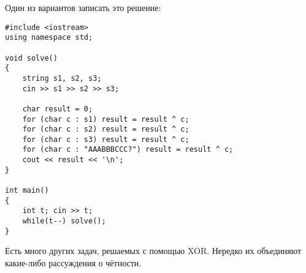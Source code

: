     Один из вариантов записать это решение:
\begin{lstlisting}
#include <iostream>
using namespace std;

void solve()
{
    string s1, s2, s3;
    cin >> s1 >> s2 >> s3;
    
    char result = 0;
    for (char c : s1) result = result ^ c;
    for (char c : s2) result = result ^ c;
    for (char c : s3) result = result ^ c;
    for (char c : "AAABBBCCC?") result = result ^ c;
    cout << result << '\n';
}

int main()
{
    int t; cin >> t;
    while(t--) solve();
}
\end{lstlisting}

    Есть много других задач, решаемых с помощью XOR. Нередко их объединяют какие-либо рассуждения о чётности.